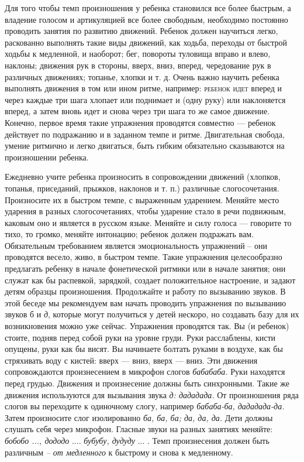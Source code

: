 \documentclass{book}
\renewcommand{\emph}[1]{\textit{#1}}
\begin{document}
Для того чтобы темп произношения у ребенка становился все более быстрым,
а владение голосом и артикуляцией все более свободным, необходимо
постоянно проводить занятия по развитию движений. Ребенок должен
научиться легко, раскованно выполнять такие виды движений, как ходьба,
переходы от быстрой ходьбы к медленной, и наоборот; бег, повороты
туловища вправо и влево, наклоны; движения рук в стороны, вверх, вниз,
вперед, чередование рук в различных движениях; топанье, хлопки и т. д.
Очень важно научить ребенка выполнять движения в том или ином ритме,
например: \textsc{ребенок идет} вперед и через каждые три шага хлопает
или поднимает и (одну руку) или наклоняется вперед, а затем вновь идет и
снова через три шага то же самое движение. Конечно, первое время такие
упражнения проводятся совместно --- ребенок действует по подражанию и в
заданном темпе и ритме. Двигательная свобода, умение ритмично и легко
двигаться, быть гибким обязательно сказываются на произношении ребенка.

Ежедневно учите ребенка произносить в сопровождении движений (хлопков,
топанья, приседаний, прыжков, наклонов и т. п.) различные
слогосочетания. Произносите их в быстром темпе, с выраженным ударением.
Меняйте место ударения в разных слогосочетаниях, чтобы ударение стало в
речи подвижным, каковым оно и является в русском языке. Меняйте и силу
голоса --- говорите то тихо, то громко, меняйте интонацию; ребенок
должен подражать вам. Обязательным требованием является эмоциональность
упражнений -- они проводятся весело, живо, в быстром темпе. Такие
упражнения целесообразно предлагать ребенку в начале фонетической
ритмики или в начале занятия; они служат как бы распевкой, зарядкой,
создает положительное настроение, и задают детям образцы произношения.
Продолжайте и работу по вызыванию звуков. В этой беседе мы рекомендуем
вам начать проводить упражнения по вызыванию звуков б и \emph{д},
которые могут получиться у детей нескоро, но создавать базу для их
возникновения можно уже сейчас. Упражнения проводятся так. Вы (и
ребенок) стоите, подняв перед собой руки на уровне груди. Руки
расслаблены, кисти опущены, руки как бы висят. Вы начинаете болтать
руками в воздухе, как бы стряхивать воду с кистей: вверх --- вниз, вверх
--- вниз. Эти движения сопровождаются произнесением в микрофон слогов
\emph{бабабаба.} Руки находятся перед грудью. Движения и произнесение
должны быть синхронными. Такие же движения используются для вызывания
звука \emph{д: дададада.} От произношения ряда слогов вы переходите к
одиночному слогу, например \emph{бабаба-ба, дададада-да.} Затем
произносите слог изолированно \emph{ба, ба, ба; да, да, да.} Дети должны
слушать себя через микрофон. Гласные звуки на разных занятиях меняйте:
\emph{бобобо ..., дододо} .... \emph{бубубу, дудуду} ... . Темп
произнесения должен быть различным \emph{-- от медленного} к быстрому и
снова к медленному.
\end{document}
